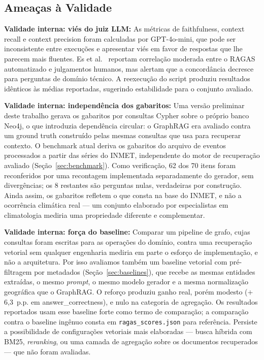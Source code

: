 \documentclass[conference]{IEEEtran}
\begin{document}
\subsection{Ameaças à Validade}

\textbf{Validade interna: viés do juiz LLM:}
As métricas de faithfulness, context recall e context precision
foram calculadas por GPT-4o-mini, que pode ser inconsistente entre
execuções e apresentar viés em favor de respostas que lhe parecem
mais fluentes.
Es et al.~\cite{es2024ragas} reportam correlação moderada entre
o RAGAS automatizado e julgamentos humanos, mas alertam que a
concordância decresce para perguntas de domínio técnico.
A reexecução do script produziu resultados idênticos às médias
reportadas, sugerindo estabilidade para o conjunto avaliado.

\textbf{Validade interna: independência dos gabaritos:}
Uma versão preliminar deste trabalho gerava os gabaritos por consultas
Cypher sobre o próprio banco Neo4j, o que introduzia dependência
circular: o GraphRAG era avaliado contra um ground truth construído
pelas mesmas consultas que usa para recuperar contexto. O benchmark
atual deriva os gabaritos do arquivo de eventos processados a partir
das séries do INMET, independente do motor de recuperação avaliado
(Seção~\ref{sec:benchmark}). Como verificação, 62 dos 70 itens foram
reconferidos por uma recontagem implementada separadamente do gerador,
sem divergências; os 8 restantes são perguntas nulas, verdadeiras por
construção. Ainda assim, os gabaritos refletem o que consta na base do
INMET, e não a ocorrência climática real --- um conjunto elaborado por
especialistas em climatologia mediria uma propriedade diferente e
complementar.

\textbf{Validade interna: força do baseline:}
Comparar um pipeline de grafo, cujas consultas foram escritas para as operações
do domínio, contra uma recuperação vetorial sem qualquer engenharia mediria em
parte o esforço de implementação, e não a arquitetura. Por isso avaliamos também
um baseline vetorial com pré-filtragem por metadados
(Seção~\ref{sec:baselines}), que recebe as mesmas entidades extraídas, o mesmo
\textit{prompt}, o mesmo modelo gerador e a mesma normalização geográfica que o
GraphRAG. O reforço produziu ganho real, porém modesto ($+$6,3~p.p. em
answer\_correctness), e nulo na categoria de agregação. Os resultados reportados
usam esse baseline forte como termo de comparação; a comparação contra o
baseline ingênuo consta em \texttt{ragas\_scores.json} para referência.
Persiste a possibilidade de configurações vetoriais mais elaboradas --- busca
híbrida com BM25, \textit{reranking}, ou uma camada de agregação sobre os
documentos recuperados --- que não foram avaliadas.
\end{document}
